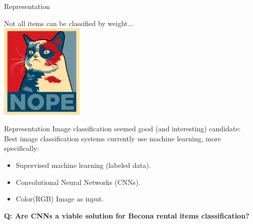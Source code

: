 \documentclass{beamer}
\begin{document}
\begin{frame}{Representation}
  \begin{center}
  Not all items can be classified by weight... \\
  \includegraphics[width=0.3\textwidth]{nope.png}
  \end{center}
\end{frame}

\begin{frame}{Representation}
Image classification seemed good (and interesting) candidate: \\
Best image classification systems currently use machine learning, more specifically:
\begin{itemize}
  \item Supervised machine learning (labeled data).
  \item Convolutional Neural Networks (CNNs).
  \item Color(RGB) Image as input.
\end{itemize}
{\large \textbf{Q: Are CNNs a viable solution for Becona rental items classification?}}
\end{frame}
\end{document}

